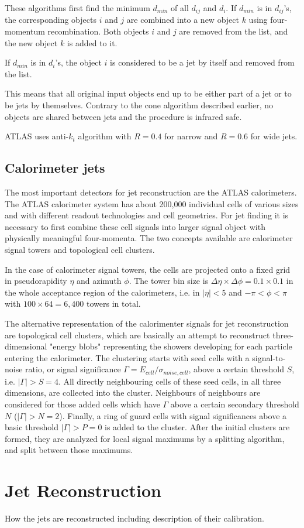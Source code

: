 These algorithms first find the minimum $d_{min}$ of all $d_{ij}$ and $d_i$. If
$d_{min}$ is in $d_{ij}$'s, the corresponding objects $i$ and $j$ are combined
into a new object $k$ using four-momentum recombination. Both objects $i$ and
$j$ are removed from the list, and the new object $k$ is added to it.

If $d_{min}$ is in $d_i$'s, the object $i$ is considered to be a jet by itself
and removed from the list.

This means that all original input objects end up to be either part of a jet or
to be jets by themselves. Contrary to the cone algorithm described earlier, no
objects are shared between jets and the procedure is infrared safe.

ATLAS uses anti-$k_t$ algorithm with $R=0.4$ for narrow and $R=0.6$ for wide
jets.

\subsection{Calorimeter jets}

The most important detectors for jet reconstruction are the ATLAS calorimeters.
The ATLAS calorimeter system has about 200,000 individual cells of various sizes
and with different readout technologies and cell geometries. For jet finding it
is necessary to first combine these cell signals into larger signal object with
physically meaningful four-momenta. The two concepts available are calorimeter
signal towers and topological cell clusters.

In the case of calorimeter signal towers, the cells are projected onto a fixed
grid in pseudorapidity $\eta$ and azimuth $\phi$. The tower bin size is $\Delta
\eta \times \Delta \phi = 0.1 \times 0.1$ in the whole acceptance region of the
calorimeters, i.e. in $|\eta| < 5$ and $- \pi < \phi < \pi$ with $100 \times 64
= 6,400$ towers in total.

The alternative representation of the calorimenter signals for jet
reconstruction are topological cell clusters, which are basically an attempt to
reconstruct three-dimensional "energy blobs" representing the showers developing
for each particle entering the calorimeter. The clustering starts with seed
cells with a signal-to-noise ratio, or signal significance $\Gamma = E_{cell} /
\sigma_{noise,cell}$, above a certain threshold $S$, i.e. $|\Gamma| > S = 4$.
All directly neighbouring cells of these seed cells, in all three dimensions,
are collected into the cluster. Neighbours of neighbours are considered for
those added cells which have $\Gamma$ above a certain secondary threshold $N$
($|\Gamma| > N = 2$). Finally, a ring of guard cells with signal significances
above a basic threshold $|\Gamma| > P = 0$ is added to the cluster. After the
initial clusters are formed, they are analyzed for local signal maximums by a
splitting algorithm, and split between those maximums.



\section{Jet Reconstruction}

How the jets are reconstructed including description of their calibration.
